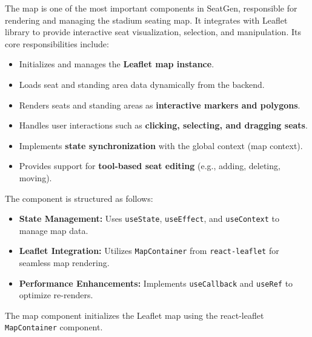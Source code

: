 The map is one of the most important components in SeatGen, responsible for rendering and managing the stadium seating map. It integrates with Leaflet library to provide interactive seat visualization, selection, and manipulation. Its core responsibilities include:

\begin{itemize}
    \item Initializes and manages the \textbf{Leaflet map instance}.
    \item Loads seat and standing area data dynamically from the backend.
    \item Renders seats and standing areas as \textbf{interactive markers and polygons}.
    \item Handles user interactions such as \textbf{clicking, selecting, and dragging seats}.
    \item Implements \textbf{state synchronization} with the global context (map context).
    \item Provides support for \textbf{tool-based seat editing} (e.g., adding, deleting, moving).
\end{itemize}

The component is structured as follows:

\begin{itemize}
    \item \textbf{State Management:} Uses \texttt{useState}, \texttt{useEffect}, and \texttt{useContext} to manage map data.
    \item \textbf{Leaflet Integration:} Utilizes \texttt{MapContainer} from \texttt{react-leaflet} for seamless map rendering.
    \item \textbf{Performance Enhancements:} Implements \texttt{useCallback} and \texttt{useRef} to optimize re-renders.
\end{itemize}


The map component initializes the Leaflet map using the react-leaflet \texttt{MapContainer} component.

